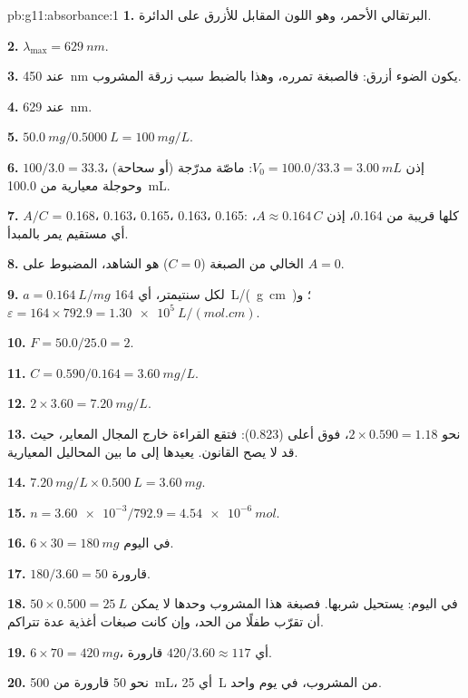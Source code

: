 \begin{solution}{pb:g11:absorbance:1}
\textbf{1.} البرتقالي الأحمر، وهو اللون المقابل للأزرق على الدائرة.

\textbf{2.} $\lambda_{\max} = \qty{629}{nm}$.

\textbf{3.} عند \qty{450}{nm} يكون الضوء أزرق: فالصبغة تمرره، وهذا بالضبط
سبب زرقة المشروب.

\textbf{4.} عند \qty{629}{nm}.

\textbf{5.} $\qty{50.0}{mg} / \qty{0.5000}{L} = \qty{100}{mg/L}$.

\textbf{6.}  $100 / 3.0 = 33.3$، إذن
$V_0 = 100.0 / 33.3 = \qty{3.00}{mL}$: ماصّة مدرّجة (أو
سحاحة) وحوجلة معيارية من \qty{100.0}{mL}.

\textbf{7.} $A/C$ = 0.168، 0.163، 0.165، 0.163، 0.165: كلها قريبة من
0.164، إذن $A \approx 0.164\, C$، أي مستقيم يمر بالمبدأ.

\textbf{8.}  الخالي من الصبغة ($C = 0$) هو الشاهد، المضبوط على
$A = 0$.

\textbf{9.} $a = \qty{0.164}{L/mg}$ لكل سنتيمتر، أي
\qty{164}{L/(g.cm)}؛ و$\varepsilon = 164 \times 792.9 =
\qty{1.30e5}{L/(mol.cm)}$.

\textbf{10.} $F = 50.0 / 25.0 = 2$.

\textbf{11.} $C = 0.590 / 0.164 = \qty{3.60}{mg/L}$.

\textbf{12.} $2 \times 3.60 = \qty{7.20}{mg/L}$.

\textbf{13.} نحو $2 \times 0.590 = 1.18$، فوق أعلى 
(0.823): فتقع القراءة خارج المجال المعاير، حيث قد لا يصح القانون. 
يعيدها إلى ما بين المحاليل المعيارية.

\textbf{14.} $\qty{7.20}{mg/L} \times \qty{0.500}{L} = \qty{3.60}{mg}$.

\textbf{15.} $n = \num{3.60e-3} / 792.9 = \qty{4.54e-6}{mol}$.

\textbf{16.} $6 \times 30 = \qty{180}{mg}$ في اليوم.

\textbf{17.} $180 / 3.60 = 50$ قارورة.

\textbf{18.} $50 \times 0.500 = \qty{25}{L}$ في اليوم: يستحيل شربها. فصبغة هذا
المشروب وحدها لا يمكن أن تقرّب طفلًا من الحد، وإن كانت صبغات أغذية عدة
تتراكم.

\textbf{19.} $6 \times 70 = \qty{420}{mg}$، أي $420 / 3.60 \approx
117$ قارورة.

\textbf{20.} نحو 50 قارورة من \qty{500}{mL}، أي \qty{25}{L} من المشروب، في
يوم واحد.
\end{solution}
